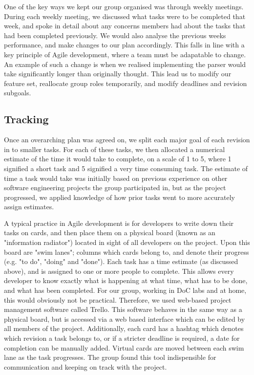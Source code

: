 \documentclass[a4paper, 11pt]{article}
\begin{document}
    One of the key ways we kept our group organised was through weekly
    meetings.  During each weekly meeting, we discussed what tasks were to be
    completed that week, and spoke in detail about any concerns members had
    about the tasks that had been completed previously. We would also analyse
    the previous weeks performance, and make changes to our plan accordingly.
    This falls in line with a key principle of Agile development, where a team
    must be adapatable to change. An example of such a change is when we
    realised implementing the parser would take significantly longer than
    originally thought. This lead us to modify our feature set, reallocate
    group roles temporarily, and modify deadlines and revision subgoals.


  \subsection{Tracking}
    Once an overarching plan was agreed on, we split each major goal of each
    revision in to smaller tasks. For each of these tasks, we then allocated a
    numerical estimate of the time it would take to complete, on a scale of 1
    to 5, where 1 signified a short task and 5 signified a very time consuming
    task. The estimate of time a task would take was initially based on
    previous experience on other software engineering projects the group
    participated in, but as the project progressed, we applied knowledge of how
    prior tasks went to more accurately assign estimates.

    A typical practice in Agile development is for developers to write down
    their tasks on cards, and then place them on a physical board (known as an
    "information radiator") located in sight of all developers on the project.
    Upon this board are "swim lanes"; columns which cards belong to, and denote
    their progress (e.g. "to do", "doing" and "done"). Each task has a time
    estimate (as discussed above), and is assigned to one or more people to
    complete.  This allows every developer to know exactly what is happening at
    what time, what has to be done, and what has been completed. For our group,
    working in DoC labs and at home, this would obviously not be practical.
    Therefore, we used web-based project management software called
    Trello. This software behaves in the same way as a physical board, but is
    accessed via a web based interface which can be edited by all members of
    the project.  Additionally, each card has a hashtag which denotes which
    revision a task belongs to, or if a stricter deadline is required, a date
    for completion can be manually added.  Virtual cards are moved between each
    swim lane as the task progresses. The group found this tool indispensible
    for communication and keeping on track with the project.
\end{document}
